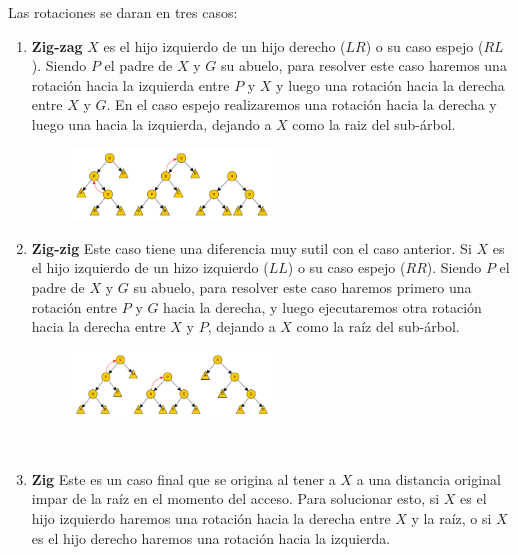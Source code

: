 \newpage

Las rotaciones se daran en tres casos:

\begin{enumerate}
 \item \textbf{Zig-zag} $X$ es el hijo izquierdo de un hijo derecho ($LR$) o su caso espejo ($RL$). Siendo $P$ el padre de $X$ y $G$ su abuelo, para resolver este caso haremos una rotaci\'on hacia la izquierda entre $P$ y $X$ y luego una rotaci\'on hacia la derecha entre $X$ y $G$. En el caso espejo realizaremos una rotaci\'on hacia la derecha y luego una hacia la izquierda, dejando a $X$ como la raiz del sub-\'arbol.
 
 \begin{figure}
 \centering
 \includegraphics[width=0.5\textwidth]{graficos/ZigZagSplay.pdf}
 \end{figure}
 
 \item \textbf{Zig-zig} Este caso tiene una diferencia muy sutil con el caso anterior. Si $X$ es el hijo izquierdo de un hizo izquierdo ($LL$) o su caso espejo ($RR$). Siendo $P$ el padre de $X$ y $G$ su abuelo, para resolver este caso haremos primero una rotaci\'on entre $P$ y $G$ hacia la derecha, y luego ejecutaremos otra rotaci\'on hacia la derecha entre $X$ y $P$, dejando a $X$ como la ra\'iz del sub-\'arbol.
 
 \begin{figure}
 \centering
 \includegraphics[width=0.5\textwidth]{graficos/ZigZigSplay.pdf}
 \end{figure}
 
 ~
 
 \item \textbf{Zig} Este es un caso final que se origina al tener a $X$ a una distancia original impar de la ra\'iz en el momento del acceso. Para solucionar esto, si $X$ es el hijo izquierdo haremos una rotaci\'on hacia la derecha entre $X$ y la ra\'iz, o si $X$ es el hijo derecho haremos una rotaci\'on hacia la izquierda.
\end{enumerate}

